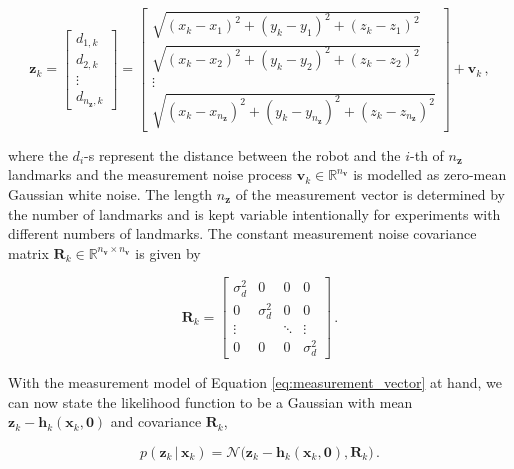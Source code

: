 \begin{equation} \label{eq:measurement_vector}
  \bm{z}_k = \begin{bmatrix} d_{1,k} \\ d_{2,k} \\ \vdots \\ d_{n_{\bm{z}},k} \end{bmatrix} = \begin{bmatrix}
  	\sqrt{(x_k - x_{1})^2 + (y_k - y_{1})^2 + (z_k - z_{1})^2} \\
  	\sqrt{(x_k - x_{2})^2 + (y_k - y_{2})^2 + (z_k - z_{2})^2} \\
  	\vdots \\
  	\sqrt{(x_k - x_{n_{\bm{z}}})^2 + (y_k - y_{n_{\bm{z}}})^2 + (z_k - z_{n_{\bm{z}}})^2}
  \end{bmatrix} + \bm{v}_k 
  \,,
\end{equation}

\noindent
where the $d_i$-s represent the distance between the robot and the $i$-th of $n_{\bm{z}}$ landmarks and the measurement noise process $\bm{v}_k \in \mathbb{R}^{n_{\bm{v}}}$ is modelled as zero-mean Gaussian white noise. The length $n_{\bm{z}}$ of the measurement vector is determined by the number of landmarks and is kept variable intentionally for experiments with different numbers of landmarks. The constant measurement noise covariance matrix $\bm{R}_k \in \mathbb{R}^{n_{\bm{v}} \times n_{\bm{v}}}$ is given by

\begin{equation}
\bm{R}_k = \begin{bmatrix}
  \sigma^2_{d} & 0 & 0 & 0\\
  0 & \sigma^2_{d} & 0 & 0\\
  \vdots &   & \ddots & \vdots\\
  0 & 0 & 0 & \sigma^2_{d}
\end{bmatrix}\,.
\end{equation}

\noindent
With the measurement model of Equation \ref{eq:measurement_vector} at hand, we can now state the likelihood function to be a Gaussian with mean $\bm{z}_k - \bm{h}_{k}(\bm{x}_{k}, \bm{0})$ and covariance $\bm{R}_k$,

\begin{equation}
p(\bm{z}_k\,|\,\bm{x}_{k}) = \mathcal{N}\big(\bm{z}_k - \bm{h}_{k}(\bm{x}_{k}, \bm{0}), \bm{R}_k \big)\,.
\end{equation}



